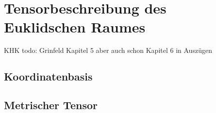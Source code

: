 
\section{Tensorbeschreibung des Euklidschen Raumes}

KHK todo: Grinfeld Kapitel 5 aber auch schon Kapitel 6 in Auszügen
 
\subsection{Koordinatenbasis}

\subsection{Metrischer Tensor}


